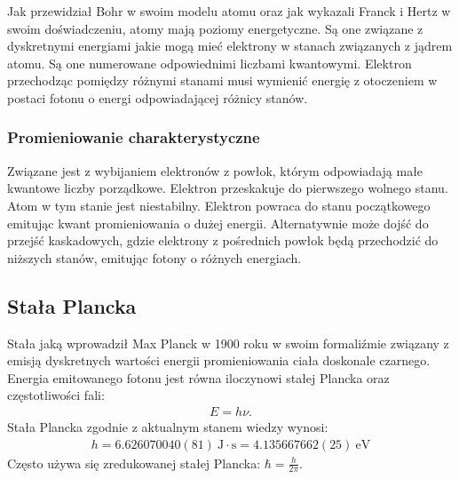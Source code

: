 \documentclass[paper=a4, fontsize=12pt]{scrartcl}
\begin{document}
Jak przewidział Bohr w swoim modelu atomu oraz jak wykazali Franck i Hertz w swoim doświadczeniu, atomy mają poziomy energetyczne. Są one związane z dyskretnymi energiami jakie mogą mieć elektrony w stanach związanych z jądrem atomu. Są one numerowane odpowiednimi liczbami kwantowymi. Elektron przechodząc pomiędzy różnymi stanami musi wymienić energię z otoczeniem w postaci fotonu o energi odpowiadającej różnicy stanów.
\subsubsection{Promieniowanie charakterystyczne}
Związane jest z wybijaniem elektronów z powłok, którym odpowiadają małe kwantowe liczby porządkowe. Elektron przeskakuje do pierwszego wolnego stanu. Atom w tym stanie jest niestabilny. Elektron powraca do stanu początkowego emitując kwant promieniowania o dużej energii. Alternatywnie może dojść do przejść kaskadowych, gdzie elektrony z pośrednich powłok będą przechodzić do niższych stanów, emitując fotony o różnych energiach.

\subsection{Stała Plancka}
Stała jaką wprowadził Max Planck w 1900 roku w swoim formaliźmie związany z emisją dyskretnych wartości energii promieniowania ciała doskonale czarnego. Energia emitowanego fotonu jest równa iloczynowi stałej Plancka oraz częstotliwości fali: \begin{align*}
E=h\nu.
\end{align*}
Stała Plancka zgodnie z aktualnym stanem wiedzy wynosi:
\begin{align*} 
h=6.626070040(81)\:\mathrm{J\cdot s}= 4.135667662(25)\:\mathrm{eV}
\end{align*}
Często używa się zredukowanej stałej Plancka: $\hbar=\frac{h}{2\pi}$.
\end{document}
